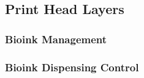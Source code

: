 \subsection{Print Head Layers}
\label{subsec:system_architectural_printhead_layers}

\subsubsection*{Bioink Management}
\label{subsubsec:system_architectural_printhead_layers_bioink_management}


\subsubsection*{Bioink Dispensing Control}
\label{subsubsec:system_architectural_printhead_layers_bioink_dispensing_control}


